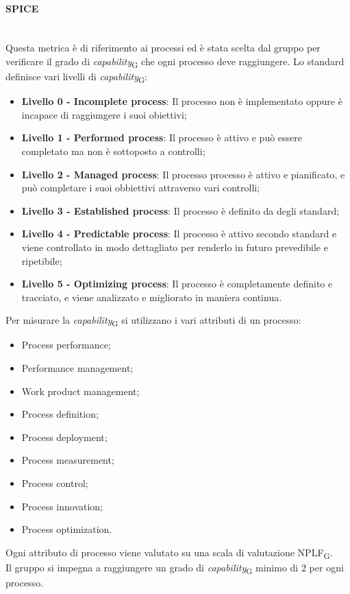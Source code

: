 \paragraph{SPICE}\mbox{}\\
Questa metrica è di riferimento ai processi ed è stata scelta dal gruppo per verificare il grado di \textit{capability}\textsubscript{G} che ogni processo deve raggiungere. Lo standard definisce vari livelli di \textit{capability}\textsubscript{G}:
\begin{itemize}
	\item \textbf{Livello 0 - Incomplete process}: Il processo non è implementato oppure è incapace di raggiungere i suoi obiettivi;
	\item \textbf{Livello 1 - Performed process}: Il processo è attivo e può essere completato ma non è sottoposto a controlli;
	\item \textbf{Livello 2 - Managed process}: Il processo processo è attivo e pianificato, e può completare i suoi obbiettivi attraverso vari controlli;
	\item \textbf{Livello 3 - Established process}: Il processo è definito da degli standard;
	\item \textbf{Livello 4 - Predictable process}: Il processo è attivo secondo standard e viene controllato in modo dettagliato per renderlo in futuro prevedibile e ripetibile;
	\item \textbf{Livello 5 - Optimizing process}: Il processo è completamente definito e tracciato, e viene analizzato e migliorato in maniera continua.
\end{itemize}
Per misurare la \textit{capability}\textsubscript{G} si utilizzano i vari attributi di un processo:
\begin{itemize}
	\item Process performance;
	\item Performance management;
	\item Work product management;
	\item Process definition;
	\item Process deployment;
	\item Process measurement;
	\item Process control;
	\item Process innovation;
	\item Process optimization.
\end{itemize}
Ogni attributo di processo viene valutato su una scala di valutazione NPLF\textsubscript{G}.\\ Il gruppo si impegna a raggiungere un grado di \textit{capability}\textsubscript{G} minimo di 2 per ogni processo.
